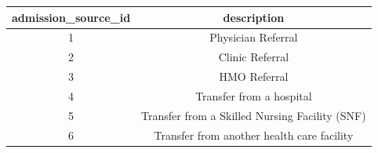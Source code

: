 \documentclass[]{article}
\begin{document}
\begin{itemize}
  \begin{longtable}[c]{@{}cc@{}}
  \toprule
  \begin{minipage}[b]{0.29\columnwidth}\centering\strut
  admission\_source\_id
  \strut\end{minipage} &
  \begin{minipage}[b]{0.37\columnwidth}\centering\strut
  description
  \strut\end{minipage}\tabularnewline
  \midrule
  \endhead
  \begin{minipage}[t]{0.29\columnwidth}\centering\strut
  1
  \strut\end{minipage} &
  \begin{minipage}[t]{0.37\columnwidth}\centering\strut
  Physician Referral
  \strut\end{minipage}\tabularnewline
  \begin{minipage}[t]{0.29\columnwidth}\centering\strut
  2
  \strut\end{minipage} &
  \begin{minipage}[t]{0.37\columnwidth}\centering\strut
  Clinic Referral
  \strut\end{minipage}\tabularnewline
  \begin{minipage}[t]{0.29\columnwidth}\centering\strut
  3
  \strut\end{minipage} &
  \begin{minipage}[t]{0.37\columnwidth}\centering\strut
  HMO Referral
  \strut\end{minipage}\tabularnewline
  \begin{minipage}[t]{0.29\columnwidth}\centering\strut
  4
  \strut\end{minipage} &
  \begin{minipage}[t]{0.37\columnwidth}\centering\strut
  Transfer from a hospital
  \strut\end{minipage}\tabularnewline
  \begin{minipage}[t]{0.29\columnwidth}\centering\strut
  5
  \strut\end{minipage} &
  \begin{minipage}[t]{0.37\columnwidth}\centering\strut
  Transfer from a Skilled Nursing Facility (SNF)
  \strut\end{minipage}\tabularnewline
  \begin{minipage}[t]{0.29\columnwidth}\centering\strut
  6
  \strut\end{minipage} &
  \begin{minipage}[t]{0.37\columnwidth}\centering\strut
  Transfer from another health care facility

\end{minipage}
\end{longtable}
\end{itemize}
\end{document}
